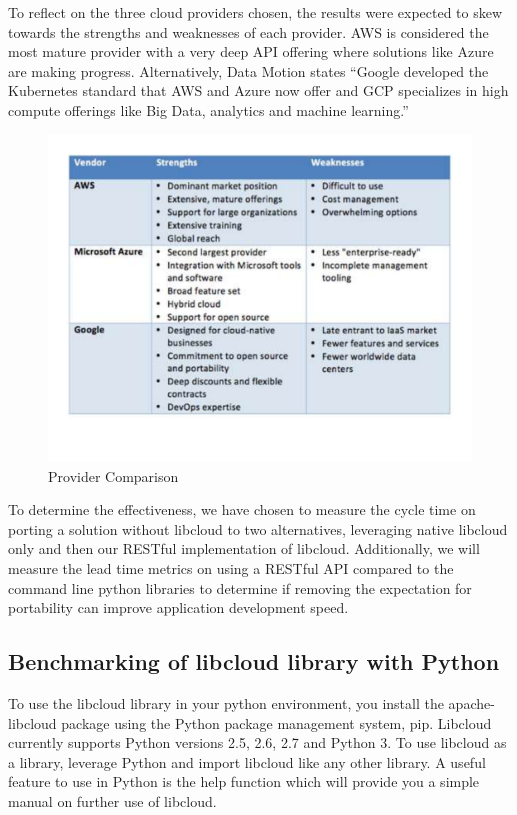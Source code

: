 To reflect on the three cloud providers chosen, the results were expected to
skew towards the strengths and weaknesses of each provider. AWS is considered
the most mature provider with a very deep API offering where solutions like
Azure are making progress. Alternatively, Data Motion states ``Google developed
the Kubernetes standard that AWS and Azure now offer and GCP specializes in high
compute offerings like Big Data, analytics and machine
learning.''\cite{hid-sp18-518-DataMotion}

\begin{figure}[!ht]
  \centering
  \includegraphics[width=\columnwidth]{images/aws-azure-google.pdf}
  \caption{Provider Comparison}\label{F:comparison}
\end{figure}

To determine the effectiveness, we have chosen to measure the cycle time on
porting a solution without libcloud to two alternatives, leveraging native
libcloud only and then our RESTful implementation of libcloud. Additionally, we
will measure the lead time metrics on using a RESTful API compared to the
command line python libraries to determine if removing the expectation for
portability can improve application development speed.

\subsection{Benchmarking of libcloud library with Python}

To use the libcloud library in your python environment, you install the
apache-libcloud package using the Python package management system, pip.
Libcloud currently supports Python versions 2.5, 2.6, 2.7 and Python 3. To use
libcloud as a library, leverage Python and import libcloud like any other
library. A useful feature to use in Python is the help function which will
provide you a simple manual on further use of libcloud.


